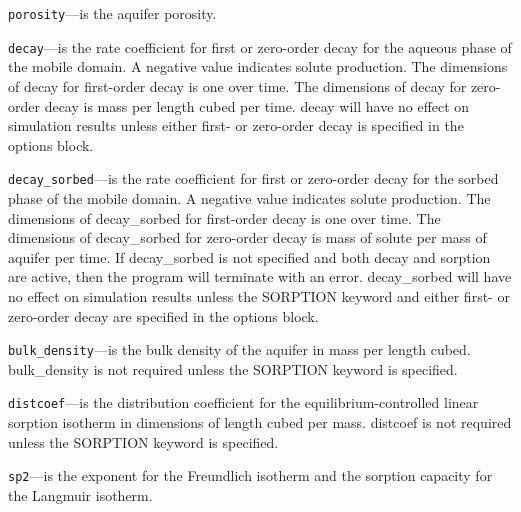 \begin{description}
\item \texttt{porosity}---is the aquifer porosity.

\item \texttt{decay}---is the rate coefficient for first or zero-order decay for the aqueous phase of the mobile domain.  A negative value indicates solute production.  The dimensions of decay for first-order decay is one over time.  The dimensions of decay for zero-order decay is mass per length cubed per time.  decay will have no effect on simulation results unless either first- or zero-order decay is specified in the options block.

\item \texttt{decay\_sorbed}---is the rate coefficient for first or zero-order decay for the sorbed phase of the mobile domain.  A negative value indicates solute production.  The dimensions of decay\_sorbed for first-order decay is one over time.  The dimensions of decay\_sorbed for zero-order decay is mass of solute per mass of aquifer per time.  If decay\_sorbed is not specified and both decay and sorption are active, then the program will terminate with an error.  decay\_sorbed will have no effect on simulation results unless the SORPTION keyword and either first- or zero-order decay are specified in the options block.

\item \texttt{bulk\_density}---is the bulk density of the aquifer in mass per length cubed.  bulk\_density is not required unless the SORPTION keyword is specified.

\item \texttt{distcoef}---is the distribution coefficient for the equilibrium-controlled linear sorption isotherm in dimensions of length cubed per mass.  distcoef is not required unless the SORPTION keyword is specified.

\item \texttt{sp2}---is the exponent for the Freundlich isotherm and the sorption capacity for the Langmuir isotherm.

\end{description}

